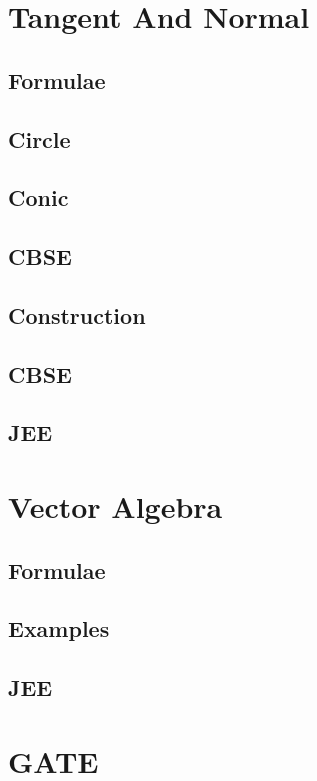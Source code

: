 \documentclass[journal]{IEEEtran}
\begin{document}
	\newpage
	\section{Tangent And Normal}
	\subsection{Formulae}
	
	\subsection{Circle}
	
	\subsection{Conic}
	
	\subsection{CBSE}
	
	\subsection{Construction}
	
	\subsection{CBSE}
	
	\subsection{JEE}
	
	\newpage
	\section{Vector Algebra}
	\subsection{Formulae}
	
	\subsection{Examples}
	
	\subsection{JEE}
	
	\newpage
	\section{GATE}
	
	\newpage
	\appendices
\end{document}
